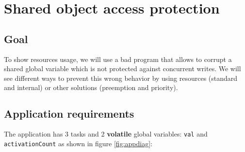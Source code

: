 \documentclass[11pt]{article}
\begin{document}
\section{Shared object access protection}

\subsection{Goal}

To show resources usage, we will use a bad program that allows to corrupt a shared global variable which is not protected against concurrent writes. We will see different ways to prevent this wrong behavior by using resources (standard and internal) or other solutions (preemption and priority).

\subsection{Application requirements}

The application has 3 tasks and 2 \textbf{volatile} global variables: \texttt{val} and \texttt{activationCount} as shown in figure \ref{fig:appdiag}:

\def\alarm#1#2{
  \node[alarm](#1) [#2] {};
  \coordinate (a) at ($(#1.north)$);
  \coordinate (b) at ($(#1.north east)$);
  \coordinate (c) at ($(#1.north west)$);
  \coordinate (d) at ($(#1)$);
  \draw[thick] ($(a)+(-0.1,0)$) rectangle ($(a)+(0.1,0.1)$);
  \draw[rotate=-45,thick] ($(b)+(-0.05,0)$) rectangle ($(b)+(0.05,0.1)$);
  \draw[rotate=45,thick] ($(c)+(-0.05,0)$) rectangle ($(c)+(0.05,0.1)$);
  \draw ($(d)+(0.3,0)$) -- (d) -- ($(d)+(0,0.3)$);
  \node [font=\scriptsize,below=0.5mm of #1] {{\em Alarm}}
}

\def\sharedvar#1#2#3{
  \node (#1) [#2] {#1};
  \coordinate (a) at ($(#1.north #3) + (0,0.2)$);
  \coordinate (b) at ($(#1.south #3) + (0,-0.2)$);
  \draw[ultra thick] (a) -- (b);
  \draw ($(a)+(-0.1,0)$) -- ($(a)+(0.1,0)$); 
  \draw ($(b)+(-0.1,0)$) -- ($(b)+(0.1,0)$) 
}

\def\varrect#1{
  \draw ($(#1.south west)$) rectangle ($(#1.north east)$)
}
\end{document}
